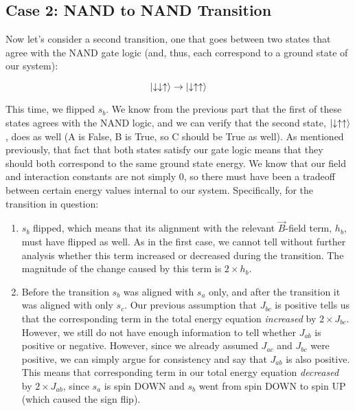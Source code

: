 \documentclass[]{article}
\newcommand{\sd}{\ensuremath{\downarrow}}
\newcommand{\trans}{\ensuremath{\rightarrow}} \def\tightlist{}
\begin{document}
\subsection{Case 2: NAND to NAND
Transition}\label{case-2-nand-to-nand-transition}

Now let's consider a second transition, one that goes between two states
that agree with the NAND gate logic (and, thus, each correspond to a
ground state of our system):

\[\ket{\sd\sd\su} \trans \ket{\sd\su\su}\]

This time, we flipped \(s_b\). We know from the previous part that the
first of these states agrees with the NAND logic, and we can verify that
the second state, \(\ket{\sd\su\su}\), does as well (A is False, B is
True, so C should be True as well). As mentioned previously, that fact
that both states satisfy our gate logic means that they should both
correspond to the same ground state energy. We know that our field and
interaction constants are not simply 0, so there must have been a
tradeoff between certain energy values internal to our system.
Specifically, for the transition in question:

\begin{enumerate}
\def\labelenumi{\arabic{enumi}.}
\tightlist
\item
  \(s_b\) flipped, which means that its alignment with the relevant
  \(\vec{B}\)-field term, \(h_b\), must have flipped as well. As in the
  first case, we cannot tell without further analysis whether this term
  increased or decreased during the transition. The magnitude of the
  change caused by this term is \(2 \times h_b\).
\item
  Before the transition \(s_b\) was aligned with \(s_a\) only, and after
  the transition it was aligned with only \(s_c\). Our previous
  assumption that \(J_{bc}\) is positive tells us that the corresponding
  term in the total energy equation \emph{increased} by
  \(2 \times J_{bc}\). However, we still do not have enough information
  to tell whether \(J_{ab}\) is positive or negative. However, since we
  already assumed \(J_{ac}\) and \(J_{bc}\) were positive, we can simply
  argue for consistency and say that \(J_{ab}\) is also positive. This
  means that corresponding term in our total energy equation
  \emph{decreased} by \(2 \times  J_{ab}\), since \(s_a\) is spin DOWN
  and \(s_b\) went from spin DOWN to spin UP (which caused the sign
  flip).
\end{enumerate}
\end{document}
